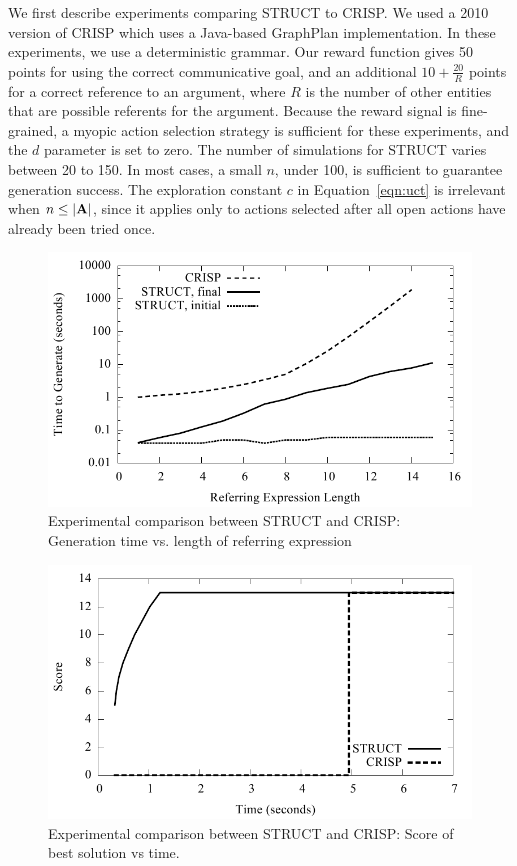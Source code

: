 We first describe experiments comparing STRUCT to CRISP. We used a
2010 version of CRISP  which uses a Java-based GraphPlan
implementation. In these
experiments, we use a deterministic grammar.  Our reward function
gives 50 points for using the correct communicative goal, and an
additional $10 + \frac{20}{R}$ points for a correct reference to an
argument, where $R$ is the number of other entities that are possible
referents for the argument. Because the reward signal is fine-grained,
 a myopic action selection strategy is
sufficient for these experiments, and 
the $d$ parameter is set to zero. The
number of simulations for STRUCT varies between 20 to 150.
In most cases, a small $n$, under 100, is sufficient
to guarantee generation success.  The exploration constant $c$ in
Equation~\ref{eqn:uct} is irrelevant when $n \leq |\bf{A}|$, since it
applies only to actions selected after all open actions have already
been tried once.

\begin{figure}
\includegraphics[width=0.7 \linewidth ]{../analysis/plots/complex-goal/complex-goal.pdf}
\caption{Experimental comparison between STRUCT and  CRISP: 
Generation time vs. length of referring expression }
\label{crisp-comparison-gentime}
\end{figure}

\begin{figure}
\includegraphics[width=0.7 \linewidth ]{../analysis/plots/complex-goal/complex-goal-anytime.pdf}
\caption{Experimental comparison between STRUCT and  CRISP:
Score of best solution vs time.}
\label{crisp-comparison-score}
\end{figure}

